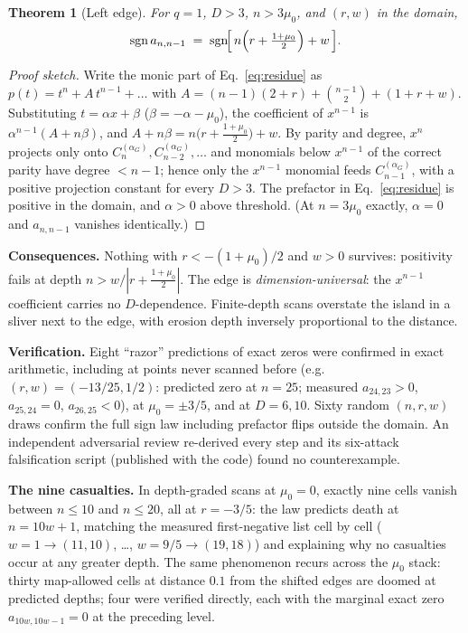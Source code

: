 \documentclass[11pt]{article}
\newtheorem{theorem}{Theorem}
\newcommand{\sgn}{\operatorname{sgn}}
\begin{document}
\begin{theorem}[Left edge]\label{thm:edge}
For $q=1$, $D>3$, $n>3\mu_0$, and $(r,w)$ in the domain,
\begin{equation}
\sgn a_{n,n-1} \;=\; \sgn\!\Bigl[\,n\Bigl(r+\tfrac{1+\mu_0}{2}\Bigr)+w\,\Bigr].
\label{eq:edgelaw}
\end{equation}
\end{theorem}

\begin{proof}[Proof sketch]
Write the monic part of Eq.~\eqref{eq:residue} as
$p(t)=t^n+A\,t^{n-1}+\dots$ with $A=(n-1)(2+r)+\binom{n-1}{2}+(1+r+w)$.
Substituting $t=\alpha x+\beta$ ($\beta=-\alpha-\mu_0$), the coefficient of
$x^{n-1}$ is $\alpha^{n-1}(A+n\beta)$, and
$A+n\beta=n\bigl(r+\tfrac{1+\mu_0}{2}\bigr)+w$.
By parity and degree, $x^{n}$ projects only onto $C^{(\alpha_G)}_{n},
C^{(\alpha_G)}_{n-2},\dots$ and monomials below $x^{n-1}$ of the correct
parity have degree $<n-1$; hence only the $x^{n-1}$ monomial feeds
$C^{(\alpha_G)}_{n-1}$, with a positive projection constant for every $D>3$.
The prefactor in Eq.~\eqref{eq:residue} is positive in the domain, and
$\alpha>0$ above threshold. (At $n=3\mu_0$ exactly, $\alpha=0$ and
$a_{n,n-1}$ vanishes identically.)
\end{proof}

\noindent
\textbf{Consequences.} Nothing with $r<-(1+\mu_0)/2$ and $w>0$ survives:
positivity fails at depth $n>w/|r+\tfrac{1+\mu_0}{2}|$. The edge is
\emph{dimension-universal}: the $x^{n-1}$ coefficient carries no
$D$-dependence. Finite-depth scans overstate the island in a sliver next to
the edge, with erosion depth inversely proportional to the distance.

\textbf{Verification.} Eight ``razor'' predictions of exact zeros were
confirmed in exact arithmetic, including at points never scanned before
(e.g.\ $(r,w)=(-13/25,1/2)$: predicted zero at $n=25$; measured
$a_{24,23}>0$, $a_{25,24}=0$, $a_{26,25}<0$), at $\mu_0=\pm 3/5$, and at
$D=6,10$. Sixty random $(n,r,w)$ draws confirm the full sign law including
prefactor flips outside the domain. An independent adversarial review
re-derived every step and its six-attack falsification script (published with
the code) found no counterexample.

\textbf{The nine casualties.} In depth-graded scans at $\mu_0=0$, exactly nine
cells vanish between $n\le 10$ and $n\le 20$, all at $r=-3/5$: the law
predicts death at $n=10w+1$, matching the measured first-negative list cell by
cell ($w=1\to(11,10)$, \dots, $w=9/5\to(19,18)$) and explaining why no
casualties occur at any greater depth. The same phenomenon recurs across the
$\mu_0$ stack: thirty map-allowed cells at distance $0.1$ from the shifted
edges are doomed at predicted depths; four were verified directly, each with
the marginal exact zero $a_{10w,10w-1}=0$ at the preceding level.
\end{document}

